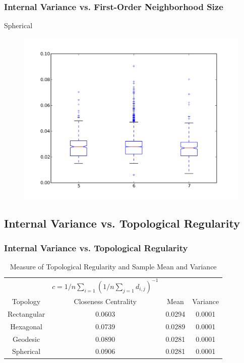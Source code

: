 \documentclass[nototal,handout]{beamer}
\begin{document}
\begin{frame}
	\frametitle{Internal Variance vs. First-Order Neighborhood Size}
 
\begin{block}{Spherical}
  \begin{center}
  \begin{figure}
  \includegraphics[width=0.75\linewidth]{graph_iv_box.png}
  \end{figure}
  \end{center}
 \end{block} \end{frame} 

\subsection{Internal Variance vs. Topological Regularity} 

\begin{frame}
	\frametitle{Internal Variance vs. Topological Regularity}
  \begin{table}
  \centering
  \begin{minipage}{\textwidth}
  \caption{Measure of Topological Regularity and Sample Mean and Variance}
  \label{vardeg}
  \begin{tabular}{|c||c|c|c|}
  \hline
  &$c=1/n \sum_{i=1} (1/n \sum_{j=1} d_{i,j})^{-1}$&&\\
  Topology & Closeness Centrality & Mean & Variance\\
  \hline
  Rectangular & 0.0603 & 0.0294 &0.0001\\
  Hexagonal & 0.0739 & 0.0289 &0.0001\\
  Geodesic & 0.0890 & 0.0281 &0.0001\\
  Spherical & 0.0906 & 0.0281 &0.0001\\
  \hline
  \end{tabular}
  \end{minipage}
  \end{table}
 \end{frame} 
\end{document}
